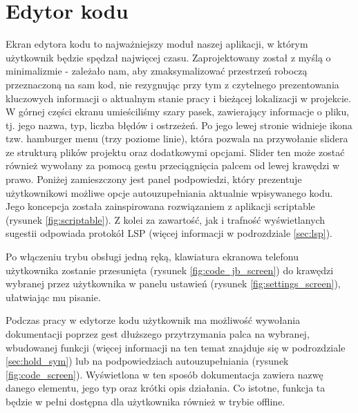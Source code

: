 \section{Edytor kodu}
\label{sec:code}
Ekran edytora kodu to najważniejszy moduł naszej aplikacji, w którym użytkownik będzie spędzał najwięcej czasu. Zaprojektowany został z myślą o minimalizmie - zależało nam, aby zmaksymalizować przestrzeń roboczą przeznaczoną na sam kod, nie rezygnując przy tym z czytelnego prezentowania kluczowych informacji o aktualnym stanie pracy i bieżącej lokalizacji w projekcie.
\newline\newline
W górnej części ekranu umieściliśmy szary pasek, zawierający informacje o pliku, tj. jego nazwa, typ, liczba błędów i ostrzeżeń. Po jego lewej stronie widnieje ikona tzw. hamburger menu (trzy poziome linie), która pozwala na przywołanie slidera ze strukturą plików projektu oraz dodatkowymi opcjami. Slider ten może zostać również wywołany za pomocą gestu przeciągnięcia palcem od lewej krawędzi w prawo.
\newline\newline
Poniżej zamieszczony jest panel podpowiedzi, który prezentuje użytkownikowi możliwe opcje autouzupełniania aktualnie wpisywanego kodu. Jego koncepcja została zainspirowana rozwiązaniem z aplikacji scriptable (rysunek \ref{fig:scriptable}). Z kolei za zawartość, jak i trafność wyświetlanych sugestii odpowiada protokół LSP (więcej informacji w podrozdziale \ref{sec:lsp}).

Po włączeniu trybu obsługi jedną ręką, klawiatura ekranowa telefonu użytkownika zostanie przesunięta (rysunek \ref{fig:code_jb_screen}) do krawędzi wybranej przez użytkownika w panelu ustawień (rysunek \ref{fig:settings_screen}), ułatwiając mu pisanie.

Podczas pracy w edytorze kodu użytkownik ma możliwość wywołania dokumentacji poprzez gest dłuższego przytrzymania palca na wybranej, wbudowanej funkcji (więcej informacji na ten temat znajduje się w podrozdziale \ref{sec:hold_sym}) lub na podpowiedziach autouzupełniania (rysunek \ref{fig:code_screen}). Wyświetlona w ten sposób dokumentacja zawiera nazwę danego elementu, jego typ oraz krótki opis działania. Co istotne, funkcja ta będzie w pełni dostępna dla użytkownika również w trybie offline.

